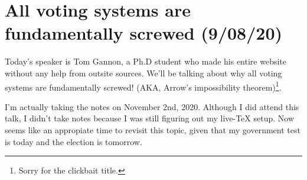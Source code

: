 \section{All voting systems are fundamentally screwed (9/08/20)}
Today's speaker is Tom Gannon, a Ph.D student who made his entire website without any help from outsite sources. We'll be talking about why all voting systems are fundamentally screwed! (AKA, Arrow's impossibility theorem)\footnote{Sorry for the clickbait title.}.
\begin{note}
    I'm actually taking the notes on November 2nd, 2020. Although I did attend this talk, I didn't take notes because I was still figuring out my live-\TeX{} setup. Now seems like an appropiate time to revisit this topic, given that my government test is today and the election is tomorrow.
\end{note}
